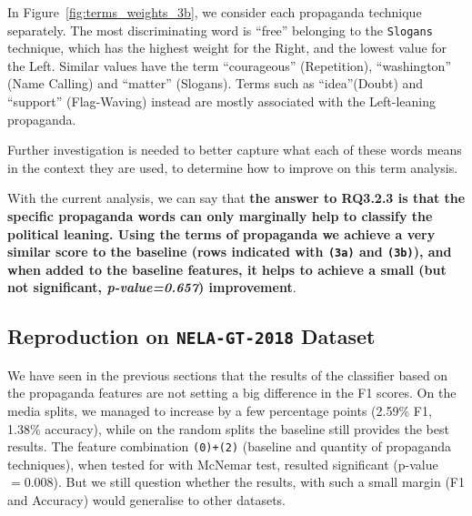 In Figure~\ref{fig:terms_weights_3b}, we consider each propaganda technique separately. The most discriminating word is ``free'' belonging to the \texttt{Slogans} technique, which has the highest weight for the Right, and the lowest value for the Left. Similar values have the term ``courageous'' (Repetition), ``washington'' (Name Calling) and ``matter'' (Slogans). Terms such as ``idea''(Doubt) and ``support'' (Flag-Waving) instead are mostly associated with the Left-leaning propaganda.

Further investigation is needed to better capture what each of these words means in the context they are used, to determine how to improve on this term analysis.%

With the current analysis, we can say that \textbf{the answer to RQ3.2.3 is that the specific propaganda words can only marginally help to classify the political leaning. Using the terms of propaganda we achieve a very similar score to the baseline (rows indicated with \texttt{(3a)} and \texttt{(3b)}), and when added to the baseline features, it helps to achieve a small (but not significant, \textit{p-value=0.657}) improvement}. %


\subsection{\statusgreen Reproduction on \texttt{NELA-GT-2018} Dataset}
\label{ssec:ps_prop_leaning_classifier_nela}




We have seen in the previous sections that the results of the classifier based on the propaganda features are not setting a big difference in the F1 scores. On the media splits, we managed to increase by a few percentage points (2.59\% F1, 1.38\% accuracy), while on the random splits the baseline still provides the best results.
The feature combination \texttt{(0)+(2)} (baseline and quantity of propaganda techniques), when tested for with McNemar test, resulted significant (p-value $=0.008$).
But we still question whether the results, with such a small margin (F1 and Accuracy) would generalise to other datasets.

